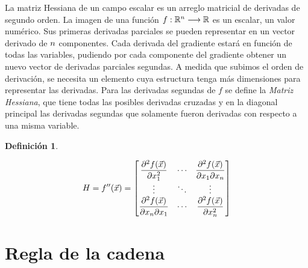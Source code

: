 \documentclass[a5paper,12pt,twoside]{book}
\newtheorem{defn}{{Definición}}[chapter]
\begin{document}
La matriz Hessiana de un campo escalar es un arreglo matricial de derivadas de segundo orden.
La imagen de una función $f:\mathbb{R}^n \longrightarrow \mathbb{R}$ es un escalar, un valor numérico.
Sus primeras derivadas parciales se pueden representar en un vector derivado de $n$ componentes.
Cada derivada del gradiente estará en función de todas las variables, pudiendo por cada componente del gradiente obtener un nuevo vector de derivadas parciales segundas.
A medida que subimos el orden de derivación, se necesita un elemento cuya estructura tenga más dimensiones para representar las derivadas.
Para las derivadas segundas de $f$ se define la \emph{Matriz Hessiana}, que tiene todas las posibles derivadas cruzadas y en la diagonal principal las derivadas segundas que solamente fueron derivadas con respecto a una misma variable.

\begin{mdframed}[style=DefinitionFrame]
    \begin{defn}
    \end{defn}
    \begin{equation*}
        H = f''(\Vec{x}) =
        \begin{bmatrix}
            \dfrac{\partial^2 f(\Vec{x})}{\partial x_1^2} & \cdots & \dfrac{\partial^2 f(\Vec{x})}{\partial x_1 \partial x_n}
            \\
            \vdots & \ddots & \vdots
            \\
            \dfrac{\partial^2 f(\Vec{x})}{\partial x_n \partial x_1} & \cdots & \dfrac{\partial^2 f(\Vec{x})}{\partial x_n^2}
        \end{bmatrix}
    \end{equation*}
\end{mdframed}


\section{Regla de la cadena}
\end{document}
